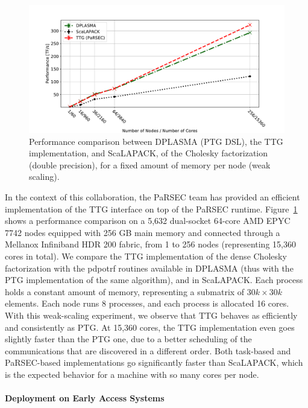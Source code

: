 \begin{figure}
\centering\includegraphics[width=.9\linewidth]{projects/2.3.1-PMR/2.3.1.09-ParSEC/dpotrf-ttg/dpotrf_1403612-page3.pdf}
\caption{Performance comparison between DPLASMA (PTG DSL), the TTG implementation, and ScaLAPACK, of the Cholesky factorization (double precision), for a fixed amount of memory per node (weak scaling).\label{fig:parsec:dpotrfttg:weakscale}}
\end{figure}
In the context of this collaboration, the PaRSEC team has provided
an efficient implementation of the TTG interface on top of the
PaRSEC runtime.
Figure~\ref{fig:parsec:dpotrfttg:weakscale} shows a performance
comparison on a 5,632 dual-socket 64-core AMD EPYC 7742 nodes equipped
with 256 GB main memory and connected through a Mellanox Infiniband
HDR 200 fabric, from 1 to 256 nodes (representing 15,360 cores in
total). We compare the TTG implementation of the dense Cholesky
factorization with the pdpotrf routines available in DPLASMA (thus
with the PTG implementation of the same algorithm), and in ScaLAPACK.
Each process holds a constant amount of memory, representing a
submatrix of $30k\times 30k$ elements. Each node runs 8 processes, and
each process is allocated 16 cores. With this weak-scaling experiment,
we observe that TTG behaves as efficiently and consistently as PTG. At
15,360 cores, the TTG implementation even goes slightly faster than
the PTG one, due to a better scheduling of the communications that are
discovered in a different order. Both task-based and PaRSEC-based
implementations go significantly faster than ScaLAPACK, which is the
expected behavior for a machine with so many cores per node.

%
%
\paragraph{Deployment on Early Access Systems\label{sec:parsec_early_access}}

